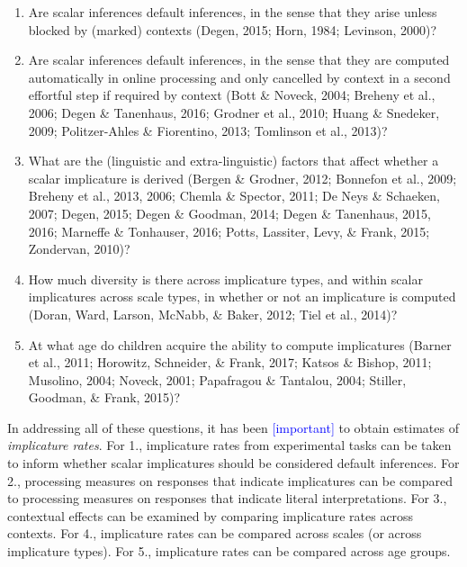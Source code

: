 \documentclass[man]{apa6}
\newcommand{\change}[1]{\textcolor{Blue}{[#1]}}
\theoremstyle{definition}
\theoremstyle{definition}
\theoremstyle{definition}
\theoremstyle{remark}
\begin{document}
\begin{enumerate}
\def\labelenumi{\arabic{enumi}.}
\item
  Are scalar inferences default inferences, in the sense that they arise
  unless blocked by (marked) contexts (Degen, 2015; Horn, 1984;
  Levinson, 2000)?
\item
  Are scalar inferences default inferences, in the sense that they are
  computed automatically in online processing and only cancelled by
  context in a second effortful step if required by context (Bott \&
  Noveck, 2004; Breheny et al., 2006; Degen \& Tanenhaus, 2016; Grodner
  et al., 2010; Huang \& Snedeker, 2009; Politzer-Ahles \& Fiorentino,
  2013; Tomlinson et al., 2013)?
\item
  What are the (linguistic and extra-linguistic) factors that affect
  whether a scalar implicature is derived (Bergen \& Grodner, 2012;
  Bonnefon et al., 2009; Breheny et al., 2013, 2006; Chemla \& Spector,
  2011; De Neys \& Schaeken, 2007; Degen, 2015; Degen \& Goodman, 2014;
  Degen \& Tanenhaus, 2015, 2016; Marneffe \& Tonhauser, 2016; Potts,
  Lassiter, Levy, \& Frank, 2015; Zondervan, 2010)?
\item
  How much diversity is there across implicature types, and within
  scalar implicatures across scale types, in whether or not an
  implicature is computed (Doran, Ward, Larson, McNabb, \& Baker, 2012;
  Tiel et al., 2014)?
\item
  At what age do children acquire the ability to compute implicatures
  (Barner et al., 2011; Horowitz, Schneider, \& Frank, 2017; Katsos \&
  Bishop, 2011; Musolino, 2004; Noveck, 2001; Papafragou \& Tantalou,
  2004; Stiller, Goodman, \& Frank, 2015)?
\end{enumerate}

In addressing all of these questions, it has been \change{important} to obtain
estimates of \emph{implicature rates}. For 1., implicature rates from
experimental tasks can be taken to inform whether scalar implicatures
should be considered default inferences. For 2., processing measures on
responses that indicate implicatures can be compared to processing
measures on responses that indicate literal interpretations. For 3.,
contextual effects can be examined by comparing implicature rates across
contexts. For 4., implicature rates can be compared across scales (or
across implicature types). For 5., implicature rates can be compared
across age groups.
\end{document}
